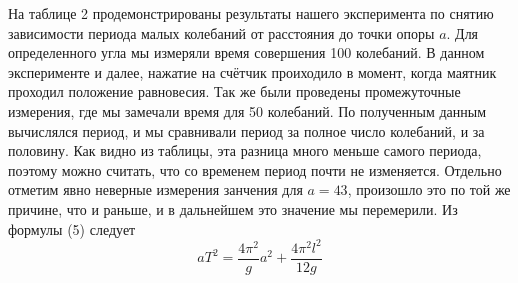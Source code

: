 \documentclass[a4paper, 10pt]{article}%
\begin{document}
На таблице 2 продемонстрированы результаты нашего эксперимента по снятию зависимости периода малых колебаний от расстояния до точки опоры $a$. Для определенного угла мы измеряли время совершения 100 колебаний. В данном эксперименте и далее, нажатие на счётчик проиходило в момент, когда маятник проходил положение равновесия.
Так же были проведены промежуточные измерения, где мы замечали время для 50 колебаний. По полученным данным вычислялся период, и мы сравнивали период за полное число колебаний, и за половину. Как видно из таблицы, эта разница много меньше самого периода, поэтому можно считать, что со временем период почти не изменяется. Отдельно отметим явно неверные измерения занчения для $a=43$, произошло это по той же причине, что и раньше, и в дальнейшем это значение мы перемерили. Из формулы (5) следует
\begin{equation}
aT^2=\frac{4\pi^2}{g}a^2+\dfrac{4\pi^2l^2}{12g}
\end{equation}
\end{document}
